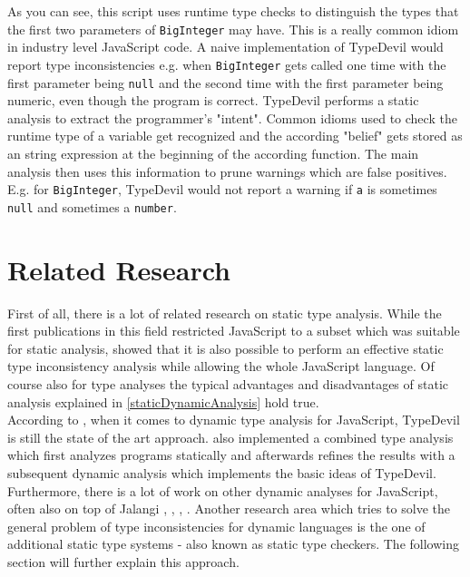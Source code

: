 \documentclass[runningheads,a4paper]{llncs}
\begin{document}
As you can see, this script uses runtime type checks to distinguish the types that the first two parameters of \lstinline[columns=fixed]{BigInteger} may have.
This is a really common idiom in industry level JavaScript code.
A naive implementation of TypeDevil would report type inconsistencies e.g. when \lstinline[columns=fixed]{BigInteger} gets called one time with the first parameter being \lstinline[columns=fixed]{null} and the second time with the first parameter being numeric, even though the program is correct. 
TypeDevil performs a static analysis to extract the programmer’s "intent".
Common idioms used to check the runtime type of a variable get recognized and the according "belief" gets stored as an string expression at the beginning of the according function.
The main analysis then uses this information to prune warnings which are false positives.
E.g. for \lstinline[columns=fixed]{BigInteger}, TypeDevil would not report a warning if \lstinline[columns=fixed]{a} is sometimes \lstinline[columns=fixed]{null} and sometimes a \lstinline[columns=fixed]{number}.

\section{Related Research}

First of all, there is a lot of related research on static type analysis.
While the first publications in this field restricted JavaScript to a subset which was suitable for static analysis, \cite{DBLP:conf/sas/JensenMT09} showed that it is also possible to perform an effective static type inconsistency analysis while allowing the whole JavaScript language.
Of course also for type analyses the typical advantages and disadvantages of static analysis explained in \ref{staticDynamicAnalysis} hold true.\\
According to \cite{DBLP:conf/icse/TanXCLYS17}, when it comes to dynamic type analysis for JavaScript, TypeDevil is still the state of the art approach. 
\cite{DBLP:conf/icse/TanXCLYS17} also implemented a combined type analysis which first analyzes programs statically and afterwards refines the results with a subsequent dynamic analysis which implements the basic ideas of TypeDevil.
Furthermore, there is a lot of work on other dynamic analyses for JavaScript, often also on top of Jalangi \cite{DBLP:phd/basesearch/Austin13}, \cite{DBLP:conf/issta/GongPSS15}, \cite{DBLP:conf/sigsoft/GongPS15}, \cite{DBLP:conf/sigsoft/JensenSSC15}.
Another research area which tries to solve the general problem of type inconsistencies for dynamic languages is the one of additional static type systems - also known as static type checkers.
The following section will further explain this approach.
\end{document}
